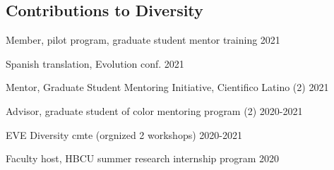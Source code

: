 \documentclass[letterpaper,10pt]{article}
\newcommand{\ignore}[1]{}
\renewenvironment{itemize}{
  \begin{list}{}{
    \setlength{\leftmargin}{1.5em}
  }
}{
  \end{list}
}
\begin{document}
\begin{itemize}
\end{itemize}



\subsection*{Contributions to Diversity}
\begin{itemize}
  \item Member, pilot program, graduate student mentor training \hfill 2021
  \item Spanish translation, Evolution conf. 2021
  \item Mentor, Graduate Student Mentoring Initiative, Cientifico Latino (2) \hfill 2021 %
  \item Advisor, graduate student of color mentoring program (2) \hfill2020-2021 %
  \item EVE Diversity cmte (orgnized 2 workshops)  \hfill 2020-2021
  \item Faculty host, HBCU summer research internship program \hfill 2020
\end{itemize}
\end{document}
